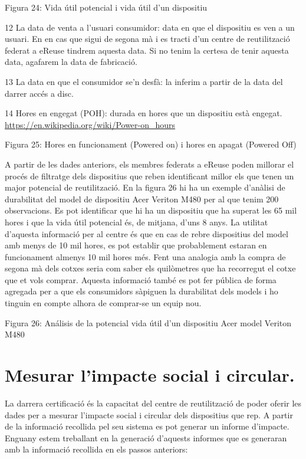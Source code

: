 \documentclass[
]{book}
\begin{document}
Figura 24: Vida útil potencial i vida útil d'un dispositiu

12 La data de venta a l'usuari consumidor: data en que el dispositiu es ven a un usuari. En en cas que sigui de segona mà i es tracti d'un centre de reutilització federat a eReuse tindrem aquesta data. Si no tenim la certesa de tenir aquesta data, agafarem la data de fabricació.

13 La data en que el consumidor se'n desfà: la inferim a partir de la data del darrer accés a disc.

14 Hores en engegat (POH): durada en hores que un dispositiu està engegat. \url{https://en.wikipedia.org/wiki/Power-on_hours}

Figura 25: Hores en funcionament (Powered on) i hores en apagat (Powered Off)

A partir de les dades anteriors, els membres federats a eReuse poden millorar el procés de filtratge dels dispositius que reben identificant millor els que tenen un major potencial de reutilització. En la figura 26 hi ha un exemple d'anàlisi de durabilitat del model de dispositiu Acer Veriton M480 per al que tenim 200 observacions. Es pot identificar que hi ha un dispositiu que ha superat les 65 mil hores i que la vida útil potencial és, de mitjana, d'uns 8 anys. La utilitat d'aquesta informació per al centre és que en cas de rebre dispositius del model amb menys de 10 mil hores, es pot establir que probablement estaran en funcionament almenys 10 mil hores més. Fent una analogia amb la compra de segona mà dels cotxes seria com saber els quilòmetres que ha recorregut el cotxe que et vols comprar. Aquesta informació també es pot fer pública de forma agregada per a que els consumidors sàpiguen la durabilitat dels models i ho tinguin en compte alhora de comprar-se un equip nou.

Figura 26: Análisis de la potencial vida útil d'un dispositiu Acer model Veriton M480

\hypertarget{mesurar-limpacte-social-i-circular.}{%
\section{Mesurar l'impacte social i circular.}\label{mesurar-limpacte-social-i-circular.}}

La darrera certificació és la capacitat del centre de reutilització de poder oferir les dades per a mesurar l'impacte social i circular dels dispositius que rep. A partir de la informació recollida pel seu sistema es pot generar un informe d'impacte. Enguany estem treballant en la generació d'aquests informes que es generaran amb la informació recollida en els passos anteriors:
\end{document}
